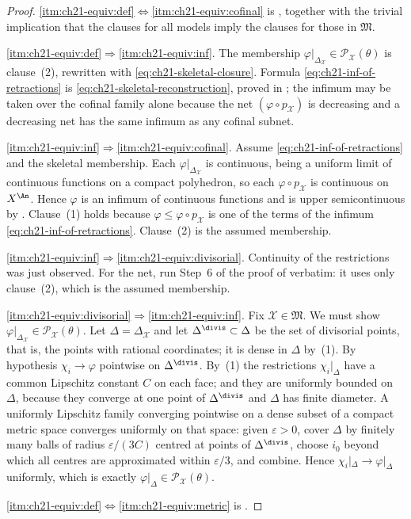\begin{proof}
\cref{itm:ch21-equiv:def}$\Leftrightarrow$\cref{itm:ch21-equiv:cofinal} is
, together with the trivial
implication that the clauses for all models imply the clauses for those in
$\mathfrak M$.

\cref{itm:ch21-equiv:def}$\Rightarrow$\cref{itm:ch21-equiv:inf}.  The membership
$\varphi|_{\Delta_{\mathcal X}}\in\mathcal P_{\mathcal X}(\theta)$ is
clause~(2), rewritten with \eqref{eq:ch21-skeletal-closure}.  Formula
\eqref{eq:ch21-inf-of-retractions} is
\eqref{eq:ch21-skeletal-reconstruction}, proved in
; the infimum may be taken over the
cofinal family alone because the net $(\varphi\circ p_{\mathcal X})$ is
decreasing and a decreasing net has the same infimum as any cofinal
subnet.

\cref{itm:ch21-equiv:inf}$\Rightarrow$\cref{itm:ch21-equiv:cofinal}.  Assume
\eqref{eq:ch21-inf-of-retractions} and the skeletal membership.  Each
$\varphi|_{\Delta_{\mathcal X}}$ is continuous, being a uniform limit of
continuous functions on a compact polyhedron, so each
$\varphi\circ p_{\mathcal X}$ is continuous on $X^{\An}$.  Hence
$\varphi$ is an infimum of continuous functions and is upper
semicontinuous by .  Clause~(1) holds because
$\varphi\leq\varphi\circ p_{\mathcal X}$ is one of the terms of the
infimum \eqref{eq:ch21-inf-of-retractions}.  Clause~(2) is the assumed
membership.

\cref{itm:ch21-equiv:inf}$\Rightarrow$\cref{itm:ch21-equiv:divisorial}.
Continuity of the restrictions was just observed.  For the net, run Step~6
of the proof of  verbatim: it uses only
clause~(2), which is the assumed membership.

\cref{itm:ch21-equiv:divisorial}$\Rightarrow$\cref{itm:ch21-equiv:inf}.  Fix
$\mathcal X\in\mathfrak M$.  We must show
$\varphi|_{\Delta_{\mathcal X}}\in\mathcal P_{\mathcal X}(\theta)$.  Let
$\Delta=\Delta_{\mathcal X}$ and let $\Delta^{\divis}\subset\Delta$ be
the set of divisorial points, that is, the points with rational
coordinates; it is dense in $\Delta$ by
\,(1).  By hypothesis
$\chi_i\to\varphi$ pointwise on $\Delta^{\divis}$.  By
\,(1) the restrictions
$\chi_i|_\Delta$ have a common Lipschitz constant $C$ on each face; and
they are uniformly bounded on $\Delta$, because they converge at one
point of $\Delta^{\divis}$ and $\Delta$ has finite diameter.  A
uniformly Lipschitz family converging pointwise on a dense subset of a
compact metric space converges uniformly on that space: given
$\varepsilon>0$, cover $\Delta$ by finitely many balls of radius
$\varepsilon/(3C)$ centred at points of $\Delta^{\divis}$, choose
$i_0$ beyond which all centres are approximated within
$\varepsilon/3$, and combine.  Hence
$\chi_i|_\Delta\to\varphi|_\Delta$ uniformly, which is exactly
$\varphi|_\Delta\in\mathcal P_{\mathcal X}(\theta)$.

\cref{itm:ch21-equiv:def}$\Leftrightarrow$\cref{itm:ch21-equiv:metric} is
.
\end{proof}

